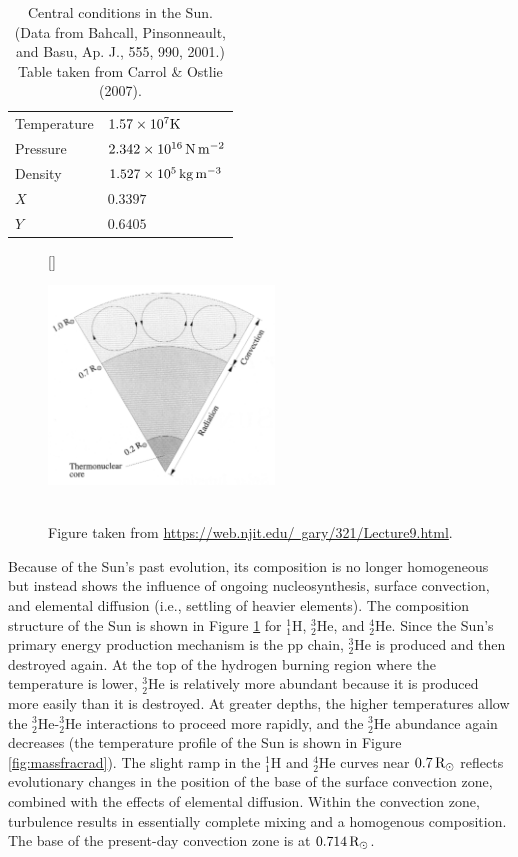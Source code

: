 \documentclass[a4paper,10pt]{article}
\begin{document}
\begin{table}[t]
{\caption{Central conditions in the Sun. (Data from Bahcall, Pinsonneault, and Basu, Ap. J., 555, 990, 2001.) Table taken from Carrol \& Ostlie (2007).}\label{table:solarconditions}}%
{\begin{tabular}{ll}
\hline
 Temperature & $1.57\times10^7{\rm K}$ \\
 Pressure    & $2.342\times10^{16}\,{\rm N\,m^{-2}}$ \\
 Density     & $1.527\times10^5\,{\rm kg\,m^{-3}}$ \\
 $X$         &  $0.3397$ \\
 $Y$         & $0.6405$ \\
 \hline
\end{tabular}}
\end{table}

\begin{figure}[t]
    [\FBwidth]
    {\caption{\footnotesize{\\Figure taken from \href{https://web.njit.edu/~gary/321/Lecture9.html}{https://web.njit.edu/~gary/321/Lecture9.html}.}}
    \label{fig:solarinterior}}
    {\includegraphics[width=6cm]{figures/SolarInterior.png}}
\end{figure}

{\noindent}Because of the Sun's past evolution, its composition is no longer homogeneous but instead shows the influence of ongoing nucleosynthesis, surface convection, and elemental diffusion (i.e., settling of heavier elements). The composition structure of the Sun is shown in Figure \ref{fig:solarinterior} for $_1^1$H, $^3_2$He, and $^4_2$He. Since the Sun's primary energy production mechanism is the pp chain, $^3_2$He is produced and then destroyed again. At the top of the hydrogen burning region where the temperature is lower, $^3_2$He is relatively more abundant because it is produced more easily than it is destroyed. At greater depths, the higher temperatures allow the $^3_2$He-$^3_2$He interactions to proceed more rapidly, and the $^3_2$He abundance again decreases (the temperature profile of the Sun is shown in Figure \ref{fig:massfracrad}). The slight ramp in the $^1_1$H and $^4_2$He curves near $0.7\,{\rm R_\odot}$ reflects evolutionary changes in the position of the base of the surface convection zone, combined with the effects of elemental diffusion. Within the convection zone, turbulence results in essentially complete mixing and a homogenous composition. The base of the present-day convection zone is at $0.714\,{\rm R_\odot}$.
\end{document}
